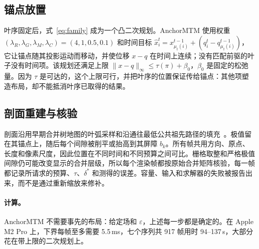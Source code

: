 \documentclass[preprint]{vgtc_zh}   %
\begin{document}
\subsection{锚点放置}
叶序固定后，式~\ref{eq:family} 成为一个凸二次规划。AnchorMTM 使用权重 $(\lambda_R,\lambda_G,\lambda_M,\lambda_C)=(4,1,0.5,0.1)$ 和时间目标 $\hat x_i^t=x_{\mu_t(i)}^{t-1}+(q_i^t-q_{\mu_t(i)}^{t-1})$，它让锚点随其投影运动而移动，并使位移 $x-q$ 在时间上连续；没有匹配前驱的叶子没有时间项。该规划还满足上限 $\|x-q\|_\infty\le\tau(\pi)+\beta_0$，$\beta_0$ 是固定的松弛量。因为 $\tau$ 是可达的，这个上限可行，并把叶序的位置保证传给锚点：其他项塑造布局，却不能抵消叶序已取得的结果。

\subsection{剖面重建与核验}
剖面沿用早期合并树地图的叶弧采样和沿通往最低公共祖先路径的填充~\cite{Koepp:2023:TMTM,STMTM:2026}。极值留在其锚点上，随后每个间隙被削平或抬高到其屏障 $b_k$。所有帧共用方向、原点、长度和像素尺度，因此位置在不同时间和不同预算之间可比。栅格取整和严格极值间隙仍可能改变显示的合并层级，所以每个渲染帧都按原始合并矩阵核验，每一帧都记录所请求的预算、$\tau$、$\delta^*$ 和测得的误差。容量、输入和求解器的失败被报告出来，而不是通过重新缩放来修补。

\paragraph{计算。} AnchorMTM 不需要事先的布局：给定场和 $\varepsilon$，上述每一步都是确定的。在 Apple M2 Pro 上，下界每帧至多需要 5.5\,ms，七个序列共 917 帧用时 94--137\,s，大部分花在带上限的二次规划上。
\end{document}
